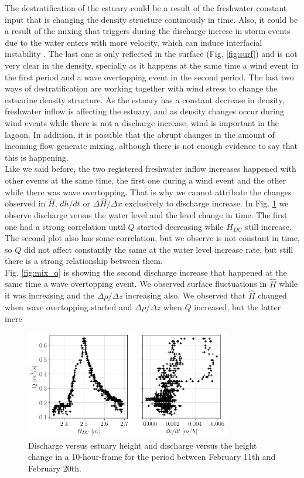 \documentclass[tesis.tex]{subfiles}
\begin{document}
The destratification of the estuary could be a result of the freshwater constant input that is changing the density structure continously in time. Also, it could be a result of the mixing that triggers during the discharge increse in storm events due to the water enters with more velocity, which can induce interfacial instability \citep{Katopodes2018}. The last one is only reflected in the surface (Fig. \ref{fig:surf}) and is not very clear in the density, specially as it happens at the same time a wind event in the first period and a wave overtopping event in the second period. The last two ways of destratification are working together with wind stress to change the estuarine density structure. As the estuary has a constant decrease in density, freshwater inflow is affecting the estuary, and as density changes occur during wind events while there is not a discharge increase, wind is important in the lagoon. In addition, it is possible that the abrupt changes in the amount of incoming flow generate mixing, although there is not enough evidence to say that this is happening.\\

Like we said before, the two registered freshwater inflow increases happened with other events at the same time, the first one during a wind event and the other while there was wave overtopping. That is why we cannot attribute the changes observed in $\hat{H}$, $dh/dt$ or $\Delta \hat{H}/\Delta x$ exclusively to discharge increase. In Fig. \ref{fig:qh} we observe discharge versus the water level and the level change in time. The first one had a strong correlation until $Q$ started decreasing while $H_{DC}$ still increase. The second plot also has some correlation, but we observe is not constant in time, so $Q$ did not affect constantly the same at the water level increase rate, but still there is a strong relationship between them.\\

Fig. \ref{fig:mix_q} is showing the second discharge increase that happened at the same time a wave overtopping event. We observed surface fluctuations in $\hat{H}$ while it was increasing and the $\Delta \rho/\Delta z$ increasing also. We observed that $\hat{H}$ changed when wave overtopping started and $\Delta \rho/\Delta z$ when $Q$ increased, but the latter incre

\begin{figure}[h!]
    \centering
    \includegraphics[width=0.8\textwidth]{Imagenes/qh.png}
    \caption{Discharge versus estuary height and discharge versus the height change in a 10-hour-frame for the period between February 11th and February 20th.}
    \label{fig:qh}
\end{figure}
\end{document}
